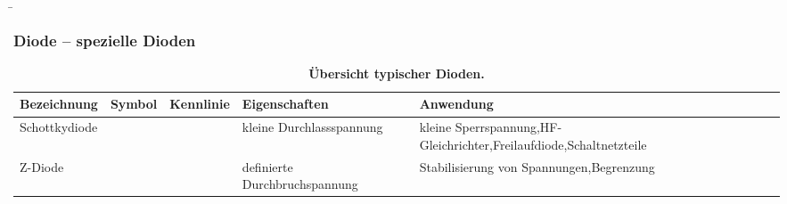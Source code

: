 \begin{frame}
    \b{
        \frametitle{Diode -- spezielle Dioden}
        \begin{table}[H]
            \centering
            \begin{tabular}{ |p{2.1cm}|p{1.4cm}|p{3.2cm}|p{2.8cm}|p{3cm}| }
                \hline
                \textbf{Bezeichnung}          & \textbf{Symbol} & \textbf{Kennlinie} & \textbf{Eigenschaften} & \textbf{Anwendung} \\
                \hline
                Schottky\-diode
                                              &
                \begin{minipage}[t][2.6cm][c]{1.4cm}
                    \centering 
                \end{minipage}
                                              &
                \begin{minipage}[t][2.6cm][c]{3.3cm}
                    \centering 
                \end{minipage}
                                              &
                kleine Durchlassspannung      &
                kleine Sperrspannung,\newline HF-Gleichrichter,\newline Freilaufdiode,\newline Schaltnetzteile                     \\
                \hline
                Z-Diode
                                              &
                \begin{minipage}[t][2.6cm][c]{1.4cm}
                    \centering 
                \end{minipage}
                                              &
                \begin{minipage}[t][2.6cm][c]{3.3cm}
                    \centering 
                \end{minipage}
                                              &
                definierte Durchbruchspannung &
                Stabilisierung von Spannungen,\newline Begrenzung                                                                  \\
                \hline
            \end{tabular}
            \caption{\textbf{Übersicht typischer Dioden.}}
        \end{table}
    }

\end{frame}


